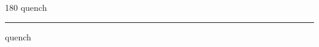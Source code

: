 
\begin{frame}
\begin{center}
\begin{turn}{180}
{\fontsize{2.5cm}{1em}\selectfont quench}
\end{turn}
\vspace{1em}\par  
\hrule
\vspace{1em}\par  
{\fontsize{2.5cm}{1em}\selectfont quench}
\end{center}
\end{frame}
